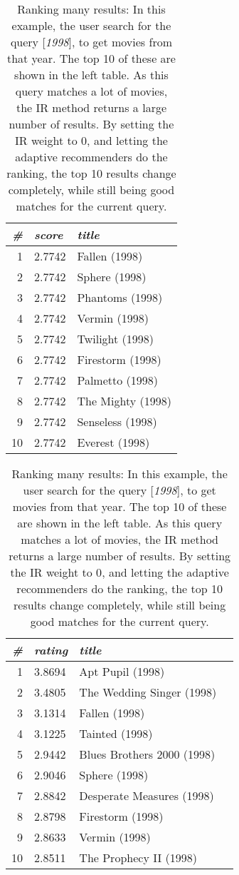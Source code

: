 \begin{table}[t]
  \centering 
  \begin{minipage}{0.49\textwidth}
    \centering 

  \begin{tabular*}{\textwidth}{ r l l }
    \toprule
    \emph{\#} & \emph{score} & \emph{title}\\
    \midrule
    1 &  2.7742  &  Fallen (1998)      \\
    2 &  2.7742  &  Sphere (1998)      \\
    3 &  2.7742  &  Phantoms (1998)    \\
    4 &  2.7742  &  Vermin (1998)      \\
    5 &  2.7742  &  Twilight (1998)    \\
    6 &  2.7742  &  Firestorm (1998)   \\
    7 &  2.7742  &  Palmetto (1998)    \\
    8 &  2.7742  &  The Mighty (1998)  \\
    9 &  2.7742  &  Senseless (1998)   \\
    10&  2.7742  &  Everest (1998)     \\
    \bottomrule
  \end{tabular*}
\end{minipage} 
\hfill 
\begin{minipage}{0.49\textwidth}
  \begin{tabular*}{\textwidth}{ r l l l }
    \toprule
    \emph{\#} & \emph{rating} & \emph{title}\\
    \midrule
    1 &  3.8694  &  Apt Pupil (1998)            \\
    2 &  3.4805  &  The Wedding Singer (1998)   \\
    3 &  3.1314  &  Fallen (1998)               \\
    4 &  3.1225  &  Tainted (1998)              \\
    5 &  2.9442  &  Blues Brothers 2000 (1998)  \\
    6 &  2.9046  &  Sphere (1998)               \\
    7 &  2.8842  &  Desperate Measures (1998)   \\
    8 &  2.8798  &  Firestorm (1998)            \\
    9 &  2.8633  &  Vermin (1998)               \\
    10&  2.8511  &  The Prophecy II (1998)      \\
    \bottomrule
  \end{tabular*}
  \end{minipage} 
  \vspace{1em}
  \caption[Ranking Many Results]{
    Ranking many results: 
    In this example, the user search for the query [\emph{1998}], to get movies from that year.
    The top 10 of these are shown in the left table. As this query matches a lot of 
    movies, the IR method returns a large number of results. By setting the IR weight to $0$,
    and letting the adaptive recommenders do the ranking, the top 10 results change completely,
    while still being good matches for the current query.
  }
  \label{table:rank:year}
\end{table}
